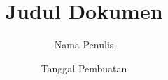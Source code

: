 \documentclass [a4paper,12pt] {article}
\begin{document}
\title{Judul Dokumen}
\author{Nama Penulis}
\date{Tanggal Pembuatan}
\end{document}
